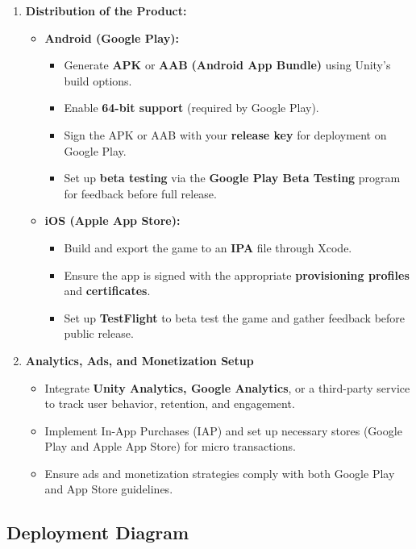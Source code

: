 \begin{enumerate}
\begin{itemize}
	\end{itemize}
	\item \textbf{Distribution of the Product:}
	\begin{itemize}
		\item \textbf{Android (Google Play):}
		\begin{itemize}
			\item {Generate \textbf{APK} or \textbf{AAB} \textbf{(Android App Bundle)} using Unity's build options.}
			\item {Enable \textbf{64-bit support} (required by Google Play).}
			\item {Sign the APK or AAB with your \textbf{release key} for deployment on Google Play.}
			\item {Set up \textbf{beta testing} via the \textbf{Google Play Beta Testing} program for feedback before full release.}
		\end{itemize}
		\item \textbf{iOS (Apple App Store):}
		\begin{itemize}
			\item {Build and export the game to an \textbf{IPA} file through Xcode.}
			\item {Ensure the app is signed with the appropriate \textbf{provisioning profiles} and \textbf{certificates}.}
			\item {Set up \textbf{TestFlight} to beta test the game and gather feedback before public release.}
		\end{itemize}
	\end{itemize}
	\item \textbf{Analytics, Ads, and Monetization Setup}
	\begin{itemize}
		\item {Integrate\textbf{ Unity Analytics, Google Analytics}, or a third-party service to track user behavior, retention, and engagement.}
		\item {Implement In-App Purchases (IAP) and set up necessary stores (Google Play and Apple App Store) for micro transactions.}
		\item {Ensure ads and monetization strategies comply with both Google Play and App Store guidelines.}
	\end{itemize}
\end{enumerate}

\subsection{Deployment Diagram}

